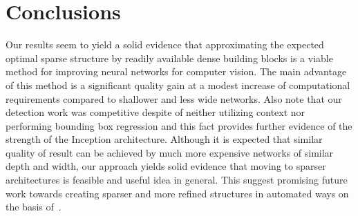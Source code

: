 \section{Conclusions}
Our results seem to yield a solid evidence that approximating the expected optimal sparse structure by readily available dense building blocks is a viable method for improving neural networks for computer vision. The main advantage of this method is a significant quality gain at a modest increase of computational requirements compared to shallower and less wide networks. Also note that our detection work was competitive despite of neither utilizing context nor performing bounding box regression and this fact provides further evidence of the strength of the Inception architecture.
Although it is expected that similar quality of result can be achieved by much more expensive networks of similar depth and width, our approach yields solid evidence that moving to sparser architectures is feasible and useful idea in general. This suggest promising future work towards creating sparser and more refined structures in automated ways on the basis of~\cite{arora2013bounds}.

